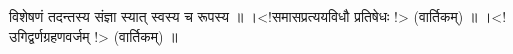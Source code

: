 विशेषणं तदन्तस्य संज्ञा स्यात् स्वस्य च रूपस्य ॥
।\textless{}!समासप्रत्ययविधौ प्रतिषेधः !\textgreater{} (वार्तिकम्) ॥
।\textless{}!उगिद्वर्णग्रहणवर्जम् !\textgreater{} (वार्तिकम्) ॥
